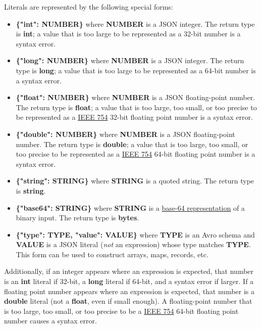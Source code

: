 \documentclass{article}
\newcommand{\PFAc}{\ttfamily\bfseries}
\theoremstyle{definition}
\begin{document}
Literals are represented by the following special forms:
\begin{itemize}
\item {\PFAc \{"int":$\!$ NUMBER\}} where {\PFAc NUMBER} is a JSON integer.  The return type is {\bf int}; a value that is too large to be represented as a 32-bit number is a syntax error.
\item {\PFAc \{"long":$\!$ NUMBER\}} where {\PFAc NUMBER} is a JSON integer.  The return type is {\bf long}; a value that is too large to be represented as a 64-bit number is a syntax error.
\item {\PFAc \{"float":$\!$ NUMBER\}} where {\PFAc NUMBER} is a JSON floating-point number.  The return type is {\bf float}; a value that is too large, too small, or too precise to be represented as a \href{http://dx.doi.org/10.1109%2FIEEESTD.2008.4610935}{IEEE 754} 32-bit floating point number is a syntax error.
\item {\PFAc \{"double":$\!$ NUMBER\}} where {\PFAc NUMBER} is a JSON floating-point number.  The return type is {\bf double}; a value that is too large, too small, or too precise to be represented as a \href{http://dx.doi.org/10.1109%2FIEEESTD.2008.4610935}{IEEE 754} 64-bit floating point number is a syntax error.
\item {\PFAc \{"string":$\!$ STRING\}} where {\PFAc STRING} is a quoted string.  The return type is {\bf string}.
\item {\PFAc \{"base64":$\!$ STRING\}} where {\PFAc STRING} is a \href{http://www.ietf.org/rfc/rfc3548.txt}{base-64 representation} of a binary input.  The return type is {\bf bytes}.
\item {\PFAc \{"type":$\!$ TYPE, "value":$\!$ VALUE\}} where {\PFAc TYPE} is an Avro schema and {\PFAc VALUE} is a JSON literal ({\it not} an expression) whose type matches {\PFAc TYPE}.  This form can be used to construct arrays, maps, records, etc.
\end{itemize}

Additionally, if an integer appears where an expression is expected, that number is an {\bf int} literal if 32-bit, a {\bf long} literal if 64-bit, and a syntax error if larger.  If a floating point number appears where an expression is expected, that number is a {\bf double} literal (not a {\bf float}, even if small enough).  A floating-point number that is too large, too small, or too precise to be a \href{http://dx.doi.org/10.1109%2FIEEESTD.2008.4610935}{IEEE 754} 64-bit floating point number causes a syntax error.
\end{document}
